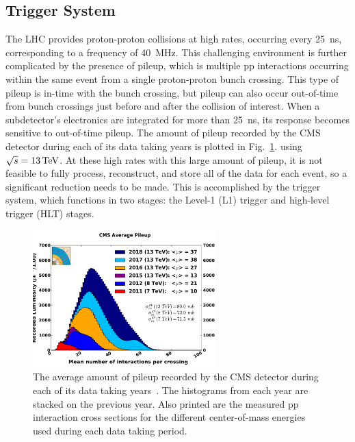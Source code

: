 \subsection{Trigger System}

The LHC provides proton-proton collisions at high rates, occurring every 25~ns, corresponding to a frequency of 40~MHz. This challenging environment is further complicated by the presence of pileup, which is multiple pp interactions occurring within the same event from a single proton-proton bunch crossing. This type of pileup is in-time with the bunch crossing, but pileup can also occur out-of-time from bunch crossings just before and after the collision of interest. When a subdetector's electronics are integrated for more than 25~ns, its response becomes sensitive to out-of-time pileup. The amount of pileup recorded by the CMS detector during each of its data taking years is plotted in Fig.~\ref{fig:CMS_pileup}.  using $\sqrt{s} = 13\,\text{Te\hspace{-.08em}V}$. At these high rates with this large amount of pileup, it is not feasible to fully process, reconstruct, and store all of the data for each event, so a significant reduction needs to be made. This is accomplished by the trigger system, which functions in two stages: the Level-1 (L1) trigger and high-level trigger (HLT) stages.

\begin{figure}[!htb]
	\centering
	\includegraphics[width=0.63\textwidth]{figures/pileup_allYears_stack.pdf}
	\caption{The average amount of pileup recorded by the CMS detector during each of its data taking years~\cite{CMS_lumi}. The histograms from each year are stacked on the previous year. Also printed are the measured pp interaction cross sections for the different center-of-mass energies used during each data taking period.}
	\label{fig:CMS_pileup}
\end{figure}

